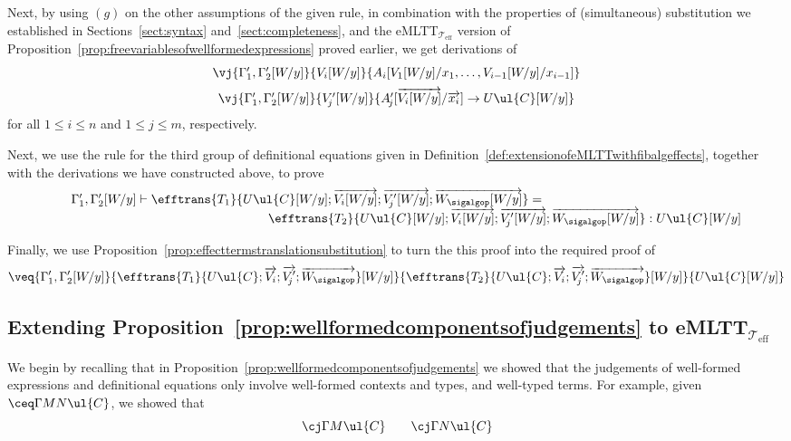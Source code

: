 Next, by using $(g)$ on the other assumptions of the given rule, in combination with 
the properties of (simultaneous) substitution we established in Sections~\ref{sect:syntax} and~\ref{sect:completeness}, and the eMLTT$_{\mathcal{T}_{\text{eff}}}$ version of Proposition~\ref{prop:freevariablesofwellformedexpressions} proved earlier, we get derivations of 
\[
\begin{array}{c}
\vj {\Gamma'_1, \Gamma'_2[W/y]} {V_i[W/y]} {A_i[V_1[W/y]/x_1, \ldots, V_{i-1}[W/y]/x_{i-1}]}
\\[2mm]
\vj {\Gamma'_1, \Gamma'_2[W/y]} {V'_{\!j}[W/y]} {A'_{\!j}[\overrightarrow{V_i[W/y]}/\overrightarrow{x_i}] \to U\ul{C}[W/y]}\end{array}
\]
for all $1 \leq i \leq n$ and $1 \leq j \leq m$, respectively. 


Next, we use the rule for the third group of definitional equations given in Definition~\ref{def:extensionofeMLTTwithfibalgeffects}, together with the derivations we have constructed above, to prove
%
\[
\begin{array}{c}
\hspace{-5cm}
{\Gamma'_1, \Gamma'_2[W/y]} \vdash {\efftrans {T_1} {U\ul{C}[W/y]; \overrightarrow{V_i[W/y]}; \overrightarrow{V'_{\!j}[W/y]}; \overrightarrow{W_{\sigalgop}[W/y]}}} = 
\\
\hspace{6cm}
{\efftrans {T_2} {U\ul{C}[W/y]; \overrightarrow{V_i[W/y]}; \overrightarrow{V'_{\!j}[W/y]}; \overrightarrow{W_{\sigalgop}[W/y]}}} : {U\ul{C}[W/y]}
\end{array}
\]

Finally, we use Proposition~\ref{prop:effecttermstranslationsubstitution} to turn the this proof into the required proof of
\[
\veq {\Gamma'_1, \Gamma'_2[W/y]} {\efftrans {T_1} {U\ul{C}; \overrightarrow{V_i}; \overrightarrow{V'_{\!j}}; \overrightarrow{W_{\sigalgop}}}[W/y]} {\efftrans {T_2} {U\ul{C}; \overrightarrow{V_i}; \overrightarrow{V'_{\!j}}; \overrightarrow{W_{\sigalgop}}}[W/y]} {U\ul{C}[W/y]}
\]

\subsection*{Extending Proposition~\ref{prop:wellformedcomponentsofjudgements} to eMLTT$_{\!\mathcal{T}_{\text{eff}}}$}

We begin by recalling that in Proposition~\ref{prop:wellformedcomponentsofjudgements} we showed that the judgements of well-formed expressions and definitional equations only involve well-formed contexts and types, and well-typed terms. For example, given $\ceq \Gamma M N {\ul{C}}$, we showed that
\[
\cj \Gamma M \ul{C}
\qquad
\cj \Gamma N \ul{C}
\]

